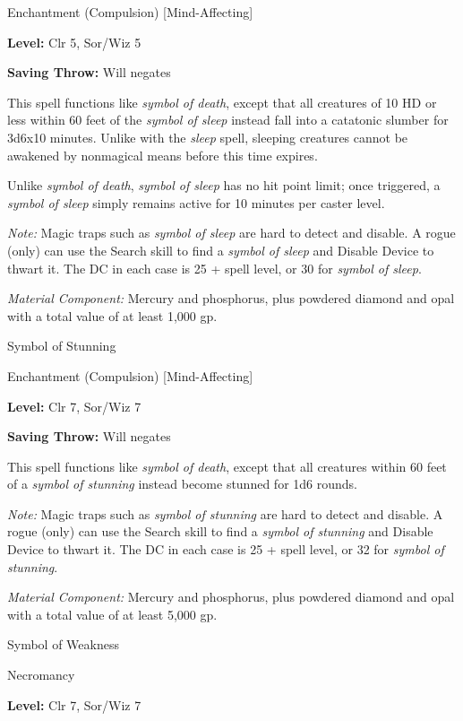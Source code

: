 \documentclass{article}
\begin{document}
Enchantment (Compulsion) [Mind-Affecting]

\textbf{Level:} Clr 5, Sor/Wiz 5

\textbf{Saving Throw: }Will negates

This spell functions like \textit{symbol of death}, except that all creatures of 
10 HD or less within 60 feet of the \textit{symbol of sleep }instead fall into 
a catatonic slumber for 3d6x10 minutes. Unlike with the \textit{sleep }spell, sleeping 
creatures cannot be awakened by nonmagical means before this time expires.

Unlike \textit{symbol of death}, \textit{symbol of sleep }has no hit point limit; 
once triggered, a \textit{symbol of sleep }simply remains active for 10 minutes 
per caster level.

\textit{Note: }Magic traps such as \textit{symbol of sleep }are hard to detect 
and disable. A rogue (only) can use the Search skill to find a \textit{symbol of 
sleep }and Disable Device to thwart it. The DC in each case is 25 + spell level, 
or 30 for \textit{symbol of sleep}.

\textit{Material Component: }Mercury and phosphorus, plus powdered diamond and 
opal with a total value of at least 1,000 gp.

\vspace{12pt}
Symbol of Stunning

Enchantment (Compulsion) [Mind-Affecting]

\textbf{Level:} Clr 7, Sor/Wiz 7

\textbf{Saving Throw: }Will negates

This spell functions like \textit{symbol of death}, except that all creatures within 
60 feet of a \textit{symbol of stunning }instead become stunned for 1d6 rounds.

\textit{Note: }Magic traps such as \textit{symbol of stunning }are hard to detect 
and disable. A rogue (only) can use the Search skill to find a \textit{symbol of 
stunning }and Disable Device to thwart it. The DC in each case is 25 + spell level, 
or 32 for \textit{symbol of stunning}.

\textit{Material Component: }Mercury and phosphorus, plus powdered diamond and 
opal with a total value of at least 5,000 gp.

\vspace{12pt}
Symbol of Weakness

Necromancy

\textbf{Level:} Clr 7, Sor/Wiz 7
\end{document}
